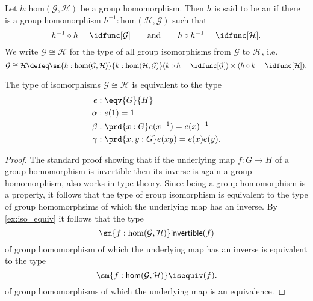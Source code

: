 \begin{defn}
Let $h:\mathrm{hom}(\mathcal{G},\mathcal{H})$ be a group homomorphism. Then $h$ is said to be an  if there is a group homomorphism $h^{-1}:\mathrm{hom}(\mathcal{H},\mathcal{G})$ such that
\begin{equation*}
h^{-1}\circ h=\idfunc[\mathcal{G}]\qquad\text{and}\qquad h\circ h^{-1}=\idfunc[\mathcal{H}].
\end{equation*}
We write $\mathcal{G}\cong\mathcal{H}$ for the type of all group isomorphisms from $\mathcal{G}$ to $\mathcal{H}$, i.e.
\begin{equation*}
\mathcal{G}\cong\mathcal{H} \defeq \sm{h:\mathrm{hom}(\mathcal{G},\mathcal{H})}{k:\mathrm{hom}(\mathcal{H},\mathcal{G})} (k\circ h = \idfunc[\mathcal{G}])\times (h\circ k=\idfunc[\mathcal{H}]).
\end{equation*}
\end{defn}

\begin{lem}\label{lem:grp_iso}
The type of isomorphisms $\mathcal{G}\cong\mathcal{H}$ is equivalent to the type
\begin{align*}
e & : \eqv{G}{H} \\
\alpha & : e(1)=1 \\
\beta & : \prd{x:G}e(x^{-1})=e(x)^{-1} \\
\gamma & : \prd{x,y:G} e(xy)=e(x)e(y).
\end{align*}
\end{lem}

\begin{proof}
The standard proof showing that if the underlying map $f:G\to H$ of a group homomorphism is invertible then its inverse is again a group homomorphism, also works in type theory. Since being a group homomorphism is a property, it follows that the type of group isomorphism is equivalent to the type of group homomorphsims of which the underlying map has an inverse. By \cref{ex:iso_equiv} it follows that the type 
\begin{equation*}
\sm{f:\mathrm{hom}(\mathcal{G},\mathcal{H})}\mathsf{invertible}(f)
\end{equation*}
of group homomorphism of which the underlying map has an inverse is equivalent to the type
\begin{equation*}
\sm{f:\mathsf{hom}(\mathcal{G},\mathcal{H})}\isequiv(f).
\end{equation*}
of group homomorphisms of which the underlying map is an equivalence.
\end{proof}

